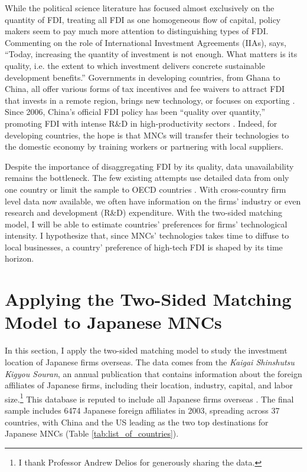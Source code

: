 While the political science literature has focused almost exclusively on the quantity of FDI, treating all FDI as one homogeneous flow of capital, policy makers seem to pay much more attention to distinguishing types of FDI. Commenting on the role of International Investment Agreements (IIAs), \citet{UNCTAD2015} says, ``Today, increasing the quantity of investment is not enough. What matters is its quality, i.e. the extent to which investment delivers concrete sustainable development benefits.'' Governments in developing countries, from Ghana to China, all offer various forms of tax incentives and fee waivers to attract FDI that invests in a remote region, brings new technology, or focuses on exporting \citep{Ricupero2000}. Since 2006, China's official FDI policy has been ``quality over quantity,'' promoting FDI with intense R\&D in high-productivity sectors \citep{Guangzhou2011}. Indeed, for developing countries, the hope is that MNCs will transfer their technologies to the domestic economy by training workers or partnering with local suppliers.

Despite the importance of disaggregating FDI by its quality, data unavailability remains the bottleneck. The few existing attempts use detailed data from only one country or limit the sample to OECD countries \citep{Alfaro2003, Alfaro2007, Javorcik2004}. With cross-country firm level data now available, we often have information on the firms' industry or even research and development (R\&D) expenditure. With the two-sided matching model, I will be able to estimate countries' preferences for firms' technological intensity. I hypothesize that, since MNCs' technologies takes time to diffuse to local businesses, a country' preference of high-tech FDI is shaped by its time horizon.

\section{Applying the Two-Sided Matching Model to Japanese MNCs}
\label{sec:application}

In this section, I apply the two-sided matching model to study the investment
location of Japanese firms overseas. The data comes from the \textit{Kaigai
  Shinshutsu Kigyou Souran}, an annual publication that contains information
about the foreign affiliates of Japanese firms, including their location,
industry, capital, and labor size.\footnote{I thank Professor Andrew Delios for
  generously sharing the data.} This database is reputed to include all Japanese
firms overseas \citep{Yamawaki1991}. The final sample includes 6474 Japanese
foreign affiliates in 2003, spreading across 37 countries, with China and the US
leading as the two top destinations for Japanese MNCs (Table \ref{tab:list_of_countries}).

